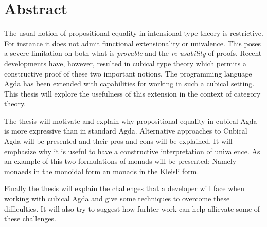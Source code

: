 \chapter*{Abstract}
The usual notion of propositional equality in intensional type-theory is
restrictive. For instance it does not admit functional extensionality or
univalence. This poses a severe limitation on both what is \emph{provable} and
the \emph{re-usability} of proofs. Recent developments have, however, resulted
in cubical type theory which permits a constructive proof of these two important
notions. The programming language Agda has been extended with capabilities for
working in such a cubical setting. This thesis will explore the usefulness of
this extension in the context of category theory.

The thesis will motivate and explain why propositional equality in cubical Agda
is more expressive than in standard Agda. Alternative approaches to Cubical Agda
will be presented and their pros and cons will be explained. It will emphasize
why it is useful to have a constructive interpretation of univalence. As an
example of this two formulations of monads will be presented: Namely monaeds in
the monoidal form an monads in the Kleisli form.

Finally the thesis will explain the challenges that a developer will face when
working with cubical Agda and give some techniques to overcome these
difficulties. It will also try to suggest how furhter work can help allievate
some of these challenges.
